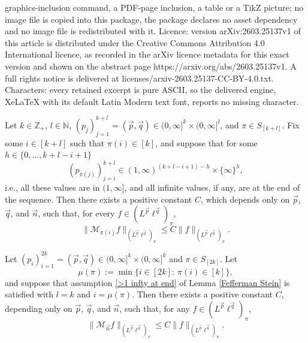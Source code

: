 \documentclass[10pt,a4paper]{amsart}
\newcommand{\Norm}[2]{\|#1\|_{#2}}
\newcommand{\vn}{\vec n}
\newcommand{\vp}{\vec p}
\newcommand{\vq}{\vec q}
\begin{document}
graphics-inclusion command, a PDF-page inclusion, a table or a TikZ picture; no image file is copied into this package, the package declares no asset dependency and no image file is redistributed with it. Licence: version arXiv:2603.25137v1 of this article is distributed under the Creative Commons Attribution 4.0 International licence, as recorded in the arXiv licence metadata for this exact version and shown on the abstract page https://arxiv.org/abs/2603.25137v1. A full rights notice is delivered at licenses/arxiv-2603.25137-CC-BY-4.0.txt. Characters: every retained excerpt is pure ASCII, so the delivered engine, XeLaTeX with its default Latin Modern text font, reports no missing character.
\begin{lemma}\label{Fefferman Stein}
Let $k\in\mathbb Z_+$, $l\in\mathbb N$, $(p_j)_{j=1}^{k+l}
=(\vp,\vq)\in(0,\infty]^k\times(0,\infty]^{l}$,
and $\pi\in S_{[k+l]}$.
Fix some $i\in[k+l]$ such that $\pi(i)\in[k]$,
and suppose that for some $h\in\{0,\ldots,k+l-i+1\}$
\begin{equation}\label{>1 infty at end}
(p_{\pi(j)})_{j=i}^{k+l}\in(1,\infty)^{(k+l-i+1)-h}\times\{\infty\}^{h},
\end{equation}
i.e., all these values are in $(1,\infty]$, and all infinite values, if any, are at the end of the sequence.
Then there exists a positive constant $C$,
which depends only on $\vp$, $\vq$, and $\vn$, such that,
for every $f\in(L^{\vp}\ell^{\vq})_\pi$,
\begin{equation*}
\Norm{ \mathcal M_{\pi(i)}f }{(L^{\vp}\ell^{\vq})_\pi}
\le C  \Norm{ f }{(L^{\vp}\ell^{\vq})_\pi}.
\end{equation*}
\end{lemma}

\begin{lemma}\label{FS strong}
Let $(p_i)_{i=1}^{2k}=(\vp,\vq)\in(0,\infty]^k\times(0,\infty]^{k}$ and $\pi\in S_{[2k]}$.
Let
\begin{equation}\label{mu}
\mu(\pi):=\min\{i\in[2k]:\ \pi(i)\in[k]\},
\end{equation}
and suppose that assumption \eqref{>1 infty at end} of Lemma \ref{Fefferman Stein} is satisfied with $l=k$ and $i=\mu(\pi)$.
Then there exists a positive constant $C$,
depending only on $\vp$, $\vq$, and $\vn$, such that,
for any  $f\in (L^{\vp}\ell^{\vq})_\pi$,
\begin{equation*}
\Norm{ \mathcal M_{\vn}f }{(L^{\vp}\ell^{\vq})_\pi}
\le C  \Norm{ f }{(L^{\vp}\ell^{\vq})_\pi}.
\end{equation*}
\end{lemma}
\end{document}
